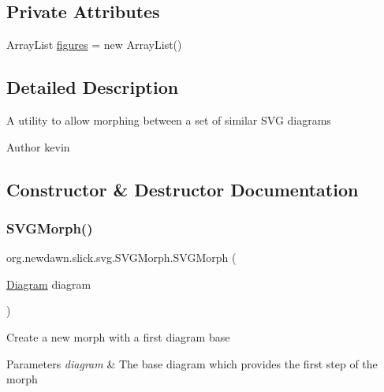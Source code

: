 \subsection*{Private Attributes}
\begin{DoxyCompactItemize}
\item 
Array\+List \mbox{\hyperlink{classorg_1_1newdawn_1_1slick_1_1svg_1_1_s_v_g_morph_ab3f69a342347ec5d6fa4c65aa6671e4b}{figures}} = new Array\+List()
\end{DoxyCompactItemize}


\subsection{Detailed Description}
A utility to allow morphing between a set of similar S\+VG diagrams

\begin{DoxyAuthor}{Author}
kevin 
\end{DoxyAuthor}


\subsection{Constructor \& Destructor Documentation}
\mbox{\label{classorg_1_1newdawn_1_1slick_1_1svg_1_1_s_v_g_morph_a34006c6c880ef50451536a41e7a74fd2}} 
\subsubsection{\texorpdfstring{S\+V\+G\+Morph()}{SVGMorph()}}
{\footnotesize\ttfamily org.\+newdawn.\+slick.\+svg.\+S\+V\+G\+Morph.\+S\+V\+G\+Morph (\begin{DoxyParamCaption}\item[{\mbox{\hyperlink{classorg_1_1newdawn_1_1slick_1_1svg_1_1_diagram}{Diagram}}}]{diagram }\end{DoxyParamCaption})\hspace{0.3cm}{\ttfamily [inline]}}

Create a new morph with a first diagram base


\begin{DoxyParams}{Parameters}
{\em diagram} & The base diagram which provides the first step of the morph \\
\hline
\end{DoxyParams}

